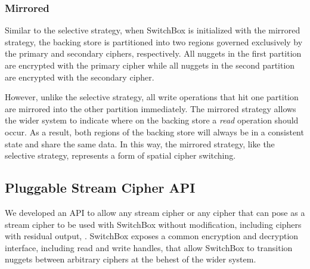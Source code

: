 \subsubsection{Mirrored}

Similar to the selective strategy, when SwitchBox is initialized with the
mirrored strategy, the backing store is partitioned into two regions governed
exclusively by the primary and secondary ciphers, respectively. All nuggets in
the first partition are encrypted with the primary cipher while all nuggets in
the second partition are encrypted with the secondary cipher.

However, unlike the selective strategy, all write operations that hit one
partition are mirrored into the other partition immediately. The mirrored
strategy allows the wider system to indicate where on the backing store a
\emph{read} operation should occur. As a result, both regions of the backing
store will always be in a consistent state and share the same data. In this way,
the mirrored strategy, like the selective strategy, represents a form of spatial
cipher switching.

\subsection{Pluggable Stream Cipher API}

 We developed an API to allow any stream cipher or any
cipher that can pose as a stream cipher to be used with SwitchBox without
modification, including ciphers with residual output, .  SwitchBox exposes a common encryption and decryption interface,
including read and write handles, that allow SwitchBox to transition nuggets
between arbitrary ciphers at the behest of the wider system. 

